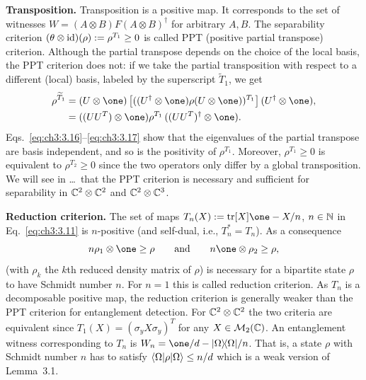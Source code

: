 \documentclass[11pt,a4paper]{article}
\numberwithin{equation}{section}
\begin{document}
\begin{example}
    \par\medskip\noindent\textbf{Transposition.}
    Transposition is a positive map. It corresponds to the set of witnesses
    $W=(A\otimes B)F(A\otimes B)^\dagger$ for arbitrary $A,B$.
    The separability criterion $(\theta\otimes \mathrm{id})(\rho):=\rho^{T_1}\ge 0$
    is called PPT (positive partial transpose) criterion. Although the partial transpose
    depends on the choice of the local basis, the PPT criterion does not: if we take the
    partial transposition with respect to a different (local) basis, labeled by the superscript
    $\widetilde T_1$, we get
    \begin{align}
        \rho^{\widetilde T_1}
         &=(U\otimes \one)\left[((U^\dagger\otimes \one)\rho(U\otimes \one))^{T_1}\right](U^\dagger\otimes \one),
        \label{eq:ch3:3.16}
        \\
         &=((UU^T)\otimes \one) \rho^{T_1}\,((UU^T)^\dagger\otimes \one).
        \label{eq:ch3:3.17}
    \end{align}
    Eqs.~\eqref{eq:ch3:3.16}--\eqref{eq:ch3:3.17} show that the eigenvalues of the partial transpose are basis independent,
    and so is the positivity of $\rho^{T_1}$. Moreover, $\rho^{T_1}\ge 0$ is equivalent to $\rho^{T_2}\ge 0$ since the two
    operators only differ by a global transposition. We will see in \dots\ that the PPT criterion is necessary and
    sufficient for separability in $\mathbb{C}^2\otimes \mathbb{C}^2$ and $\mathbb{C}^2\otimes \mathbb{C}^3$.

    \par\medskip\noindent\textbf{Reduction criterion.}
    The set of maps $T_n(X):=\tr[X]\one - X/n$, $n\in\mathbb{N}$ in Eq.~\eqref{eq:ch3:3.11} is $n$-positive (and self-dual, i.e.,
    $T_n^*=T_n$). As a consequence
    \begin{equation}\label{eq:ch3:3.18}
        n\rho_1\otimes \one \ge \rho
        \qquad\text{and}\qquad
        n\one\otimes \rho_2 \ge \rho,
    \end{equation}
    (with $\rho_k$ the $k$th reduced density matrix of $\rho$) is necessary for a bipartite state $\rho$ to have Schmidt
    number $n$. For $n=1$ this is called reduction criterion. As $T_n$ is a decomposable positive map, the reduction
    criterion is generally weaker than the PPT criterion for entanglement detection. For $\mathbb{C}^2\otimes \mathbb{C}^2$ the two
    criteria are equivalent since $T_1(X)=(\sigma_y X\sigma_y)^T$ for any $X\in \mathcal{M}_2(\mathbb{C})$. An entanglement witness
    corresponding to $T_n$ is $W_n=\one/d-\ketbra{\Omega}{\Omega}/n$. That is, a state $\rho$ with Schmidt number $n$ has
    to satisfy $\langle\Omega|\rho|\Omega\rangle\le n/d$ which is a weak version of Lemma~3.1.


\end{example}
\end{document}

